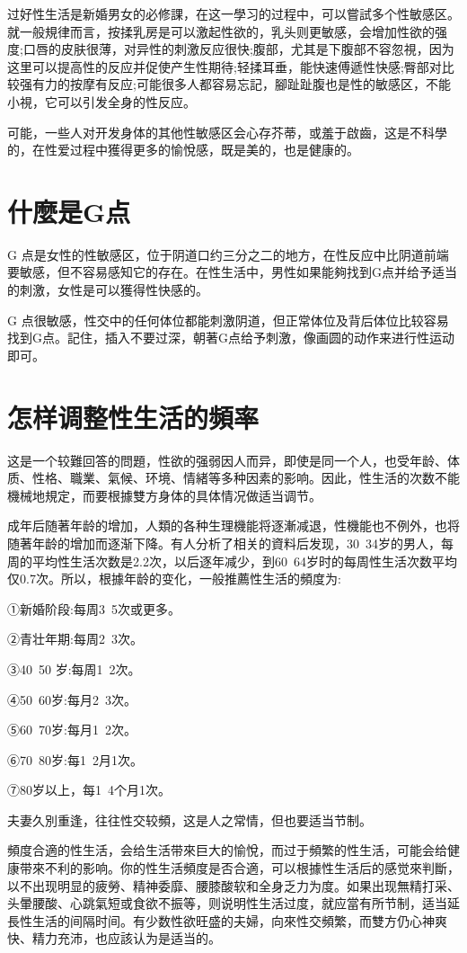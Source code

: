 \documentclass[12pt,UTF8]{ctexbook}
\begin{document}
过好性生活是新婚男女的必修課，在这一學习的过程中，可以嘗試多个性敏感区。就一般規律而言，按揉乳房是可以激起性欲的，乳头则更敏感，会增加性欲的强度;口唇的皮肤很薄，对异性的刺激反应很快;腹部，尤其是下腹部不容忽視，因为这里可以提高性的反应并促使产生性期待;轻揉耳垂，能快速傅遞性快感;臀部对比较强有力的按摩有反应;可能很多人都容易忘記，腳趾趾腹也是性的敏感区，不能小視，它可以引发全身的性反应。

可能，一些人对开发身体的其他性敏感区会心存芥蒂，或羞于啟齒，这是不科學的，在性爱过程中獲得更多的愉悅感，既是美的，也是健康的。

\section{什麼是G点}

G 点是女性的性敏感区，位于阴道口约三分之二的地方，在性反应中比阴道前端要敏感，但不容易感知它的存在。在性生活中，男性如果能夠找到G点并给予适当的刺激，女性是可以獲得性快感的。

G 点很敏感，性交中的任何体位都能刺激阴道，但正常体位及背后体位比较容易找到G点。記住，插入不要过深，朝著G点给予刺激，像画圆的动作来进行性运动即可。

\section{怎样调整性生活的頻率}

这是一个较難回答的問題，性欲的强弱因人而异，即使是同一个人，也受年龄、体质、性格、職業、氣候、环境、情緒等多种因素的影响。因此，性生活的次数不能機械地規定，而要根據雙方身体的具体情况做适当调节。

成年后随著年龄的增加，人類的各种生理機能将逐漸减退，性機能也不例外，也将随著年龄的增加而逐渐下降。有人分析了相关的資料后发现，30~34岁的男人，每周的平均性生活次数是2.2次，以后逐年减少，到60~64岁时的每周性生活次数平均仅0.7次。所以，根據年龄的变化，一般推薦性生活的頻度为:

①新婚阶段:每周3~5次或更多。

②青壮年期:每周2~3次。

③40~50 岁:每周1~2次。

④50~60岁:每月2~3次。

⑤60~70岁:每月1~2次。

⑥70~80岁:每1~2月1次。

⑦80岁以上，每1~4个月1次。

夫妻久別重逢，往往性交较頻，这是人之常情，但也要适当节制。

頻度合適的性生活，会给生活带來巨大的愉悅，而过于頻繁的性生活，可能会给健康带來不利的影响。你的性生活頻度是否合適，可以根據性生活后的感觉來判斷，以不出现明显的疲勞、精神委靡、腰膝酸软和全身乏力为度。如果出现無精打采、头暈腰酸、心跳氣短或食欲不振等，则说明性生活过度，就应當有所节制，适当延長性生活的间隔时间。有少数性欲旺盛的夫婦，向來性交頻繁，而雙方仍心神爽快、精力充沛，也应該认为是适当的。
\end{document}
